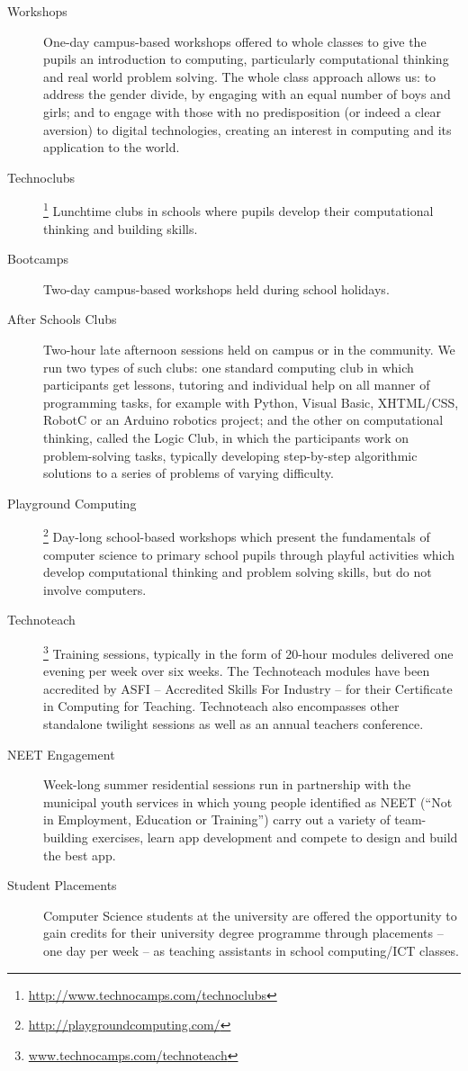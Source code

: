 \documentclass{sig-alternate}
\begin{document}
\begin{description}
\item[Workshops]
One-day campus-based workshops offered to whole classes
to give the pupils an introduction to computing,
particularly computational thinking and real world problem solving.
The whole class approach allows us: to address the gender divide,
by engaging with an equal number of boys and girls;
and to engage with those with no predisposition (or indeed a clear aversion)
to digital technologies, creating an interest in computing and its
application to the world.
\item[Technoclubs\footnotemark]\footnote{\url{http://www.technocamps.com/technoclubs}}
Lunchtime clubs in schools where pupils develop
their computational thinking and building skills.
\item[Bootcamps]
Two-day campus-based workshops held during school holidays.
\item[After Schools Clubs]
Two-hour late afternoon sessions held on campus or in the community.
We run two types of such clubs: one standard computing club
in which participants get lessons, tutoring and individual help
on all manner of programming tasks, for example with Python, Visual
Basic, XHTML/CSS,  RobotC or an Arduino robotics project;
and the other on computational thinking, called the Logic Club,
in which the participants work on problem-solving tasks,
typically developing step-by-step algorithmic solutions
to a series of problems of varying difficulty.
\item[Playground Computing\footnotemark]\footnote{\url{http://playgroundcomputing.com/}}
Day-long school-based workshops which present
the fundamentals of computer science to primary school pupils
through playful activities which develop computational thinking
and problem solving skills, but do not involve computers.
\item[Technoteach\footnotemark]\footnote{\url{www.technocamps.com/technoteach}}
Training sessions, typically in the form of 20-hour modules
delivered one evening per week over six weeks.
The Technoteach modules have been accredited by ASFI
-- Accredited Skills For Industry --
for their Certificate in Computing for Teaching.
Technoteach also encompasses other standalone twilight sessions
as well as an annual teachers conference.
\item[NEET Engagement]
Week-long summer residential sessions run in partnership with
the municipal youth services in which young people identified
as NEET (``Not in Employment, Education or Training'')
carry out a variety of team-building exercises,
learn app development and compete to design and build the best app.
\item[Student Placements]
Computer Science students at the university are offered
the opportunity to gain credits for their university degree programme through
placements -- one day per week -- as teaching assistants
in school computing/ICT classes.
\end{description}
\end{document}

